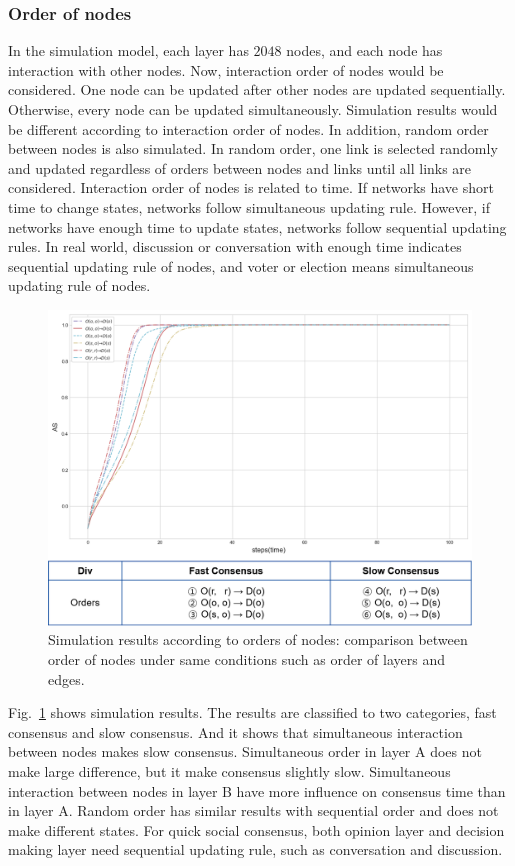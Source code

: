 \documentclass[review]{elsarticle}
\begin{document}
\subsubsection{Order of nodes}
In the simulation model, each layer has $2048$ nodes, and each node has interaction with other nodes. Now, interaction order of nodes would be considered. One node can be updated after other nodes are updated sequentially. Otherwise, every node can be updated simultaneously. Simulation results would be different according to interaction order of nodes. In addition, random order between nodes is also simulated. In random order, one link is selected randomly and updated regardless of orders between nodes and links until all links are considered. Interaction order of nodes is related to time. If networks have short time to change states, networks follow simultaneous updating rule. However, if networks have enough time to update states, networks follow sequential updating rules. In real world, discussion or conversation with enough time indicates sequential updating rule of nodes, and voter or election means simultaneous updating rule of nodes. 

\begin{figure}[!htb]
	\centering
	\includegraphics[width=\hsize]{nodeorder.png}
	\caption{Simulation results according to orders of nodes: comparison between order of nodes under same conditions such as order of layers and edges.}
	\label{nodeorder}
\end{figure}
Fig.~\ref{nodeorder} shows simulation results. The results are classified to two categories, fast consensus and slow consensus. And it shows that simultaneous interaction between nodes makes slow consensus. Simultaneous order in layer A does not make large difference, but it make consensus slightly slow. Simultaneous interaction between nodes in layer B have more influence on consensus time than in layer A. Random order has similar results with sequential order and does not make different states. For quick social consensus, both opinion layer and decision making layer need sequential updating rule, such as conversation and discussion.      
\end{document}
